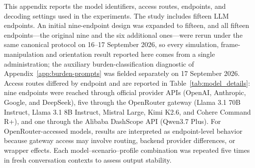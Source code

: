 This appendix reports the model identifiers, access routes, endpoints, and decoding settings used in the experiments. The study includes fifteen LLM endpoints. An initial nine-endpoint design was expanded to fifteen, and all fifteen endpoints---the original nine and the six additional ones---were rerun under the same canonical protocol on 16--17 September 2026, so every simulation, frame-manipulation and orientation result reported here comes from a single administration; the auxiliary burden-classification diagnostic of Appendix~\ref{app:burden-prompts} was fielded separately on 17 September 2026. Access routes differed by endpoint and are reported in Table~\ref{tab:model_details}: nine endpoints were reached through official provider APIs (OpenAI, Anthropic, Google, and DeepSeek), five through the OpenRouter gateway (Llama 3.1 70B Instruct, Llama 3.1 8B Instruct, Mistral Large, Kimi K2.6, and Cohere Command R+), and one through the Alibaba DashScope API (Qwen3.7 Plus). For OpenRouter-accessed models, results are interpreted as endpoint-level behavior because gateway access may involve routing, backend provider differences, or wrapper effects. Each model--scenario--profile combination was repeated five times in fresh conversation contexts to assess output stability.


